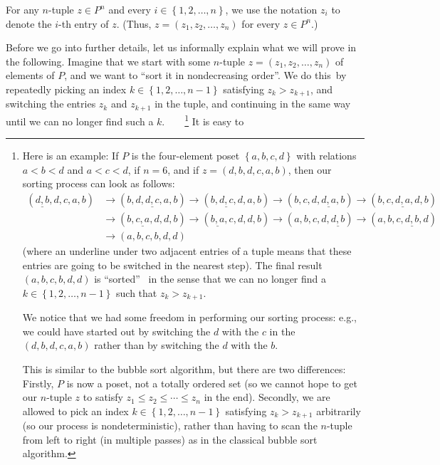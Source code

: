 \documentclass[numbers=enddot,12pt,final,onecolumn,notitlepage]{scrartcl}%
\theoremstyle{definition}
\begin{document}
For any $n$-tuple $z\in P^{n}$ and every $i\in\left\{  1,2,\ldots,n\right\}
$, we use the notation $z_{i}$ to denote the $i$-th entry of $z$. (Thus,
$z=\left(  z_{1},z_{2},\ldots,z_{n}\right)  $ for every $z\in P^{n}$.)

Before we go into further details, let us informally explain what we will
prove in the following. Imagine that we start with some $n$-tuple $z=\left(
z_{1},z_{2},\ldots,z_{n}\right)  $ of elements of $P$, and we want to
\textquotedblleft sort it in nondecreasing order\textquotedblright. We do
this\ by repeatedly picking an index $k\in\left\{  1,2,\ldots,n-1\right\}  $
satisfying $z_{k}>z_{k+1}$, and switching the entries $z_{k}$ and $z_{k+1}$ in
the tuple, and continuing in the same way until we can no longer find such a
$k$.\ \ \ \ \footnote{Here is an example: If $P$ is the four-element poset
$\left\{  a,b,c,d\right\}  $ with relations $a<b<d$ and $a<c<d$, if $n=6$, and
if $z=\left(  d,b,d,c,a,b\right)  $, then our sorting process can look as
follows:%
\begin{align*}
\left(  \underline{d,b},d,c,a,b\right)   &  \rightarrow\left(
b,d,\underline{d,c},a,b\right)  \rightarrow\left(  b,\underline{d,c}%
,d,a,b\right)  \rightarrow\left(  b,c,d,\underline{d,a},b\right)
\rightarrow\left(  b,c,\underline{d,a},d,b\right) \\
&  \rightarrow\left(  b,\underline{c,a},d,d,b\right)  \rightarrow\left(
\underline{b,a},c,d,d,b\right)  \rightarrow\left(  a,b,c,d,\underline{d,b}%
\right)  \rightarrow\left(  a,b,c,\underline{d,b},d\right) \\
&  \rightarrow\left(  a,b,c,b,d,d\right)
\end{align*}
(where an underline under two adjacent entries of a tuple means that these
entries are going to be switched in the nearest step). The final result
$\left(  a,b,c,b,d,d\right)  $ is \textquotedblleft sorted\textquotedblright%
\ in the sense that we can no longer find a $k\in\left\{  1,2,\ldots
,n-1\right\}  $ such that $z_{k}>z_{k+1}$.
\par
We notice that we had some freedom in performing our sorting process: e.g., we
could have started out by switching the $d$ with the $c$ in the $\left(
d,b,d,c,a,b\right)  $ rather than by switching the $d$ with the $b$.
\par
This is similar to the bubble sort algorithm, but there are two differences:
Firstly, $P$ is now a poset, not a totally ordered set (so we cannot hope to
get our $n$-tuple $z$ to satisfy $z_{1}\leq z_{2}\leq\cdots\leq z_{n}$ in the
end). Secondly, we are allowed to pick an index $k\in\left\{  1,2,\ldots
,n-1\right\}  $ satisfying $z_{k}>z_{k+1}$ arbitrarily (so our process is
nondeterministic), rather than having to scan the $n$-tuple from left to right
(in multiple passes) as in the classical bubble sort algorithm.} It is easy to
\end{document}
